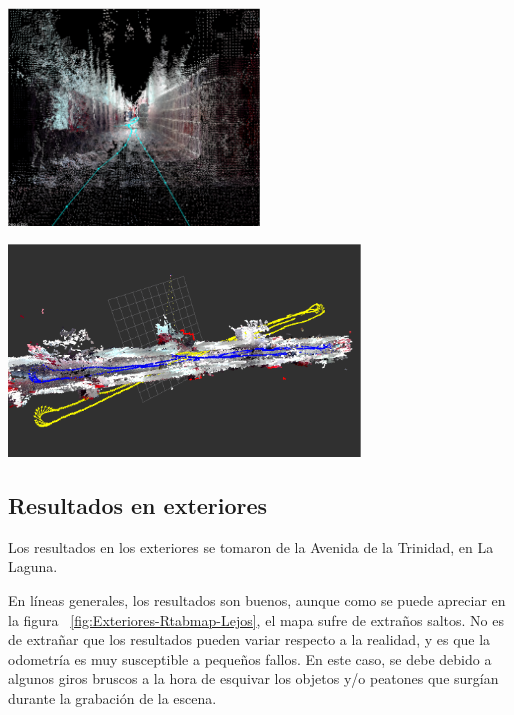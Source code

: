\begin{minipage}{\linewidth}
    \centering
    \includegraphics[width=0.5\textwidth]{images/cap4/Interiores-rtabmap-cerca.eps}
    \label{fig:Interiores-Rtabmap-Cerca}
\end{minipage}

\begin{minipage}{\linewidth}
    \centering
    \includegraphics[width=0.7\textwidth]{images/cap4/Interiores-rviz.eps}
    \label{fig:Interiores-Rviz}
\end{minipage}

\subsection{Resultados en exteriores}

Los resultados en los exteriores se tomaron de la Avenida de la Trinidad, en La
Laguna.

En líneas generales, los resultados son buenos, aunque como se puede apreciar en
la figura ~\ref{fig:Exteriores-Rtabmap-Lejos}, el mapa sufre de extraños saltos.
No es de extrañar que los resultados pueden variar respecto a la realidad, y es
que la odometría es muy susceptible a pequeños fallos. En este caso, se debe
debido a algunos giros bruscos a la hora de esquivar los objetos y/o peatones
que surgían durante la grabación de la escena.


